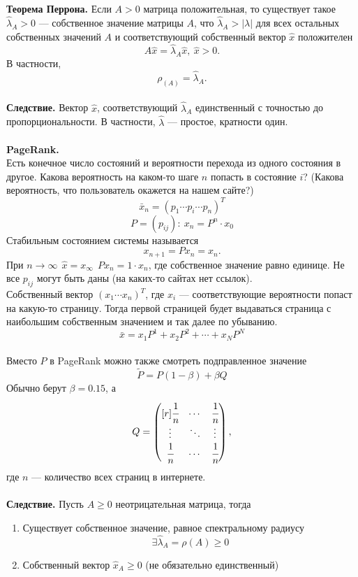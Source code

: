 \documentclass[12pt]{article}
\theoremstyle{definition}
\numberwithin{equation}{section}
\begin{document}
	\\
	\\
	\textbf{Теорема Перрона.} Если $A>0$ матрица положительная, то существует такое $\hat \lambda_A>0$ --- собственное значение матрицы $A$, что $\hat \lambda_A>|\lambda|$ для всех остальных собственных значений $A$ и соответствующий собственный вектор $\hat x$ положителен
	$$A\hat x=\hat \lambda_A \hat x,~\hat x>0.$$
	В частности, $$\rho_(A)=\hat \lambda_A.$$
	\\
	\textbf{Следствие.} Вектор $\hat x$, соответствующий $\hat \lambda_A$ единственный с точностью до пропорциональности. В частности, $\hat \lambda$ --- простое, кратности один.\\
	\\
	\textbf{PageRank.}\\
	Есть конечное число состояний и вероятности перехода из одного состояния в другое. Какова вероятность на каком-то шаге $n$ попасть в состояние $i$? (Какова вероятность, что пользователь окажется на нашем сайте?)
	$$\bar x_n=(p_1 \cdots p_i \cdots p_n)^T$$
	$$P=(p_{ij}):~x_n=P^n\cdot x_0$$
	Стабильным состоянием системы называется $$x_{n+1}=Px_n=x_n.$$
	При $n\to \infty ~~\hat x=x_{\infty}~~Px_n=1\cdot x_n$, где собственное значение равно единице.
	Не все $p_{ij}$ могут быть даны (на каких-то сайтах нет ссылок).\\
	Собственный вектор $(x_1 \cdots x_n)^T$, где $x_i$ --- соответствующие вероятности попаст на какую-то страницу. Тогда первой страницей будет выдаваться страница с наибольшим собственным значением и так далее по убыванию.
	$$\bar x=x_1P^1+x_2P^2+\cdots +x_NP^N$$
	\\
	Вместо $P$ в PageRank можно также смотреть подправленное значение $$\tilde{ P}=P(1-\beta)+\beta Q$$ Обычно берут $\beta=0.15$, а 
	\[Q = \begin{pmatrix}[r]
	\cfrac{1}{n} & \cdots & \cfrac{1}{n}\\
	\vdots & \ddots & \vdots\\
	\cfrac{1}{n} & \cdots & \cfrac{1}{n}\\
	\end{pmatrix},\]
	где $n$ --- количество всех страниц в интернете.\\ \\
	\textbf{Следствие.} Пусть $A\geqslant 0$ неотрицательная матрица, тогда
	\begin{enumerate}
		\item Существует собственное значение, равное спектральному радиусу $$\exists \hat \lambda_A=\rho(A)\geqslant 0$$
		\item Собственный вектор $\hat x_A\geqslant 0$ (не обязательно единственный)
	\end{enumerate}
\end{document}
